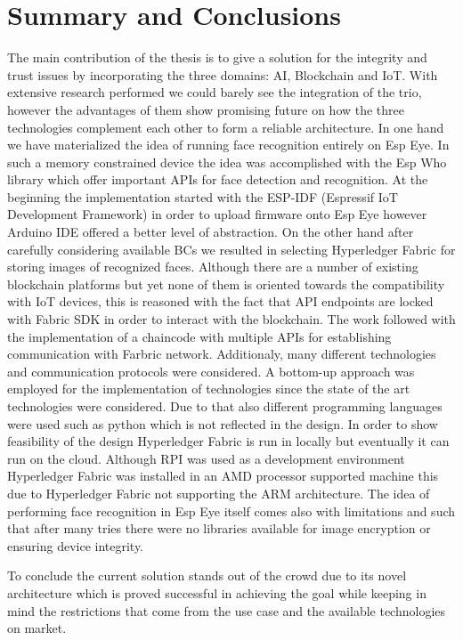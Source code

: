 \chapter{Summary and Conclusions}



The main contribution of the thesis is to give a solution for the integrity and trust issues by incorporating the three domains: AI, Blockchain and IoT. With extensive research performed we could barely see the integration of the trio, however the advantages of them show promising future on how the three technologies complement each other to form a reliable architecture. In one hand we have materialized the idea of running face recognition entirely on Esp Eye. In such a memory constrained device the idea was accomplished with the Esp Who library which offer important APIs for face detection and recognition. At the beginning the implementation started with the ESP-IDF (Espressif IoT Development Framework) in order to upload firmware onto Esp Eye however Arduino IDE offered a better level of abstraction. On the other hand after carefully considering available BCs we resulted in selecting Hyperledger Fabric for storing images of recognized faces.
Although there are a number of existing blockchain platforms but yet none of them is oriented towards the compatibility with IoT devices, this is reasoned with the fact that API endpoints are locked with Fabric SDK in order to interact with the blockchain.  The work followed with the implementation of a chaincode with multiple APIs for establishing communication with Farbric network. 
Additionaly, many different technologies and communication protocols were considered. A bottom-up approach was employed for the implementation of technologies since the state of the art technologies were considered. Due to that also different programming languages were used such as python which is not reflected in the design. In order to show feasibility of the design Hyperledger Fabric is run in locally but eventually it can run on the cloud. Although RPI was used as a development environment Hyperledger Fabric was installed in an AMD processor supported machine this due to Hyperledger Fabric not supporting the ARM architecture. 
The idea of performing face recognition in Esp Eye itself comes also with limitations and such that after many tries there were no libraries available for image encryption or ensuring device integrity. 

To conclude the current solution stands out of the crowd due to its novel architecture which is proved successful in achieving the goal while keeping in mind the restrictions that come from the use case and the available technologies on market. 


